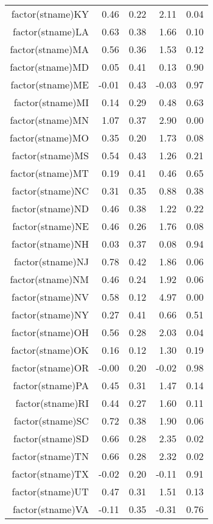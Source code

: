 \begin{table}[ht]
\begin{tabular}{rrrrr}
  factor(stname)KY & 0.46 & 0.22 & 2.11 & 0.04 \\ 
  factor(stname)LA & 0.63 & 0.38 & 1.66 & 0.10 \\ 
  factor(stname)MA & 0.56 & 0.36 & 1.53 & 0.12 \\ 
  factor(stname)MD & 0.05 & 0.41 & 0.13 & 0.90 \\ 
  factor(stname)ME & -0.01 & 0.43 & -0.03 & 0.97 \\ 
  factor(stname)MI & 0.14 & 0.29 & 0.48 & 0.63 \\ 
  factor(stname)MN & 1.07 & 0.37 & 2.90 & 0.00 \\ 
  factor(stname)MO & 0.35 & 0.20 & 1.73 & 0.08 \\ 
  factor(stname)MS & 0.54 & 0.43 & 1.26 & 0.21 \\ 
  factor(stname)MT & 0.19 & 0.41 & 0.46 & 0.65 \\ 
  factor(stname)NC & 0.31 & 0.35 & 0.88 & 0.38 \\ 
  factor(stname)ND & 0.46 & 0.38 & 1.22 & 0.22 \\ 
  factor(stname)NE & 0.46 & 0.26 & 1.76 & 0.08 \\ 
  factor(stname)NH & 0.03 & 0.37 & 0.08 & 0.94 \\ 
  factor(stname)NJ & 0.78 & 0.42 & 1.86 & 0.06 \\ 
  factor(stname)NM & 0.46 & 0.24 & 1.92 & 0.06 \\ 
  factor(stname)NV & 0.58 & 0.12 & 4.97 & 0.00 \\ 
  factor(stname)NY & 0.27 & 0.41 & 0.66 & 0.51 \\ 
  factor(stname)OH & 0.56 & 0.28 & 2.03 & 0.04 \\ 
  factor(stname)OK & 0.16 & 0.12 & 1.30 & 0.19 \\ 
  factor(stname)OR & -0.00 & 0.20 & -0.02 & 0.98 \\ 
  factor(stname)PA & 0.45 & 0.31 & 1.47 & 0.14 \\ 
  factor(stname)RI & 0.44 & 0.27 & 1.60 & 0.11 \\ 
  factor(stname)SC & 0.72 & 0.38 & 1.90 & 0.06 \\ 
  factor(stname)SD & 0.66 & 0.28 & 2.35 & 0.02 \\ 
  factor(stname)TN & 0.66 & 0.28 & 2.32 & 0.02 \\ 
  factor(stname)TX & -0.02 & 0.20 & -0.11 & 0.91 \\ 
  factor(stname)UT & 0.47 & 0.31 & 1.51 & 0.13 \\ 
  factor(stname)VA & -0.11 & 0.35 & -0.31 & 0.76 \\ 

\end{tabular}
\end{table}
